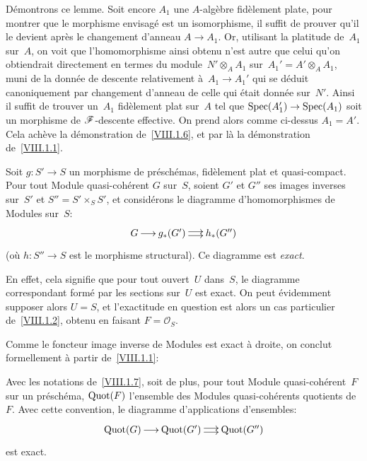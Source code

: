 D\'emontrons ce lemme. Soit encore $A_{1}$ une $A$-alg\`ebre
fid\`element plate, pour montrer que le morphisme envisag\'e est
un isomorphisme, il suffit de prouver qu'il le devient apr\`es le
changement d'anneau
$A\to A_1$.
Or, utilisant la platitude de~$A_{1}$ sur~$A$, on voit que
l'homomorphisme ainsi obtenu n'est autre que celui qu'on obtiendrait
directement en termes du module~$N'\otimes_{A}A_{1}$ sur~$A_{1}'=A'\otimes_{A}A_{1}$, muni de la donn\'ee de descente
relativement \`a~$A_{1}\to A_{1}'$ qui se d\'eduit canoniquement
par changement d'anneau de celle qui \'etait donn\'ee
sur~$N'$. Ainsi il suffit de trouver un~$A_{1}$ fid\`element plat
sur~$A$ tel que $\Spec(A_{1}')\to \Spec(A_{1})$ soit un morphisme de
$\cal{F}$-descente effective. On prend alors comme ci-dessus
$A_{1}=A'$. Cela ach\`eve la d\'emonstration de~\ref{VIII.1.6}, et
par l\`a la d\'emonstration de~\ref{VIII.1.1}.

\begin{corollaire}
\label{VIII.1.7}
Soit $g\colon S'\to S$ un morphisme de pr\'esch\'emas,
fid\`element plat et quasi-compact. Pour tout Module
quasi-coh\'erent $G$ sur~$S$, soient $G'$ et $G''$ ses images
inverses sur~$S'$ et $S''=S'\times_{S}S'$, et consid\'erons le
diagramme d'homomorphismes de Modules sur~$S$:
$$
\xymatrix@C=.5cm{{G}\ar[r]&{g_*(G')}\ar@<2pt>[r]\ar@<-2pt>[r]&{h_*(G'')}}
$$
(o\`u $h\colon S''\to S$ est le morphisme structural). Ce diagramme
est \emph{exact}.
\end{corollaire}

En
effet, cela signifie que pour tout ouvert~$U$ dans~$S$, le diagramme
correspondant form\'e par les sections sur~$U$ est exact. On peut
\'evidemment supposer alors $U=S$, et l'exactitude en question est
alors un cas particulier de~\ref{VIII.1.2}, obtenu en faisant
$F=\mathcal{O}_{S}$.

Comme le foncteur image inverse de Modules est exact \`a droite, on
conclut formellement \`a partir de~\ref{VIII.1.1}:

\begin{corollaire}
\label{VIII.1.8}
Avec les notations de~\ref{VIII.1.7}, soit de plus, pour tout Module
quasi-coh\'erent~$F$ sur un pr\'esch\'ema, $\operatorname{Quot}(F)$ l'ensemble
des Modules quasi-coh\'erents quotients de~$F$. Avec cette
convention, le diagramme d'applications d'ensembles:
$$
\xymatrix@C=.5cm{{\mathrm{Quot}(G)}\ar[r]&{\mathrm{Quot}(G')}\ar@<2pt>[r]\ar@<-2pt>[r]&{\mathrm{Quot}(G'')}}
$$
est exact.
\end{corollaire}

